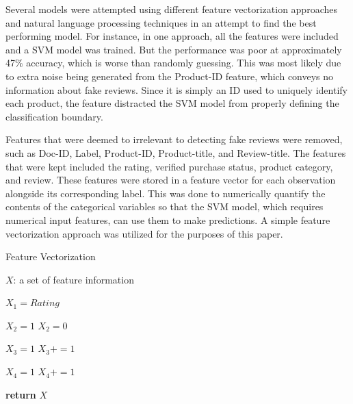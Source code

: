 \documentclass[12pt]{article}
\begin{document}
\bigskip

Several models were attempted using different feature vectorization approaches and natural language processing techniques in an attempt to find the best performing model. For instance, in one approach, all the features were included and a SVM model was trained. But the performance was poor at approximately 47$\%$ accuracy, which is worse than randomly guessing. This was most likely due to extra noise being generated from the Product-ID feature, which conveys no information about fake reviews. Since it is simply an ID used to uniquely identify each product, the feature distracted the SVM model from properly defining the classification boundary.

Features that were deemed to irrelevant to detecting fake reviews were removed, such as Doc-ID, Label, Product-ID, Product-title, and Review-title. The features that were kept included the rating, verified purchase status, product category, and review. These features were stored in a feature vector for each observation alongside its corresponding label. This was done to numerically quantify the contents of the categorical variables so that the SVM model, which requires numerical input features, can use them to make predictions. A simple feature vectorization approach was utilized for the purposes of this paper. 

\bigskip

\begin{algorithm}
\caption{Feature Vectorization}\label{alg:feature-vector}
\begin{algorithmic}
\State $X$: a set of feature information

    \State $X_{1} = Rating$
    \bigskip
    
        \State $X_{2} = 1$
    \Else
        \State $X_{2} = 0$
    \EndIf
    \bigskip
    
        \State $X_{3} = 1$
    \Else
        \State $X_{3} \mathrel{{+}{=}} 1$
    \EndIf
    \bigskip

            \State $X_{4} = 1$
        \Else
            \State $X_{4} \mathrel{{+}{=}} 1$
        \EndIf
    \EndFor
    \bigskip
    
    \State \textbf{return} $X$
    
    \EndProcedure

\end{algorithmic}
\end{algorithm}
\end{document}
